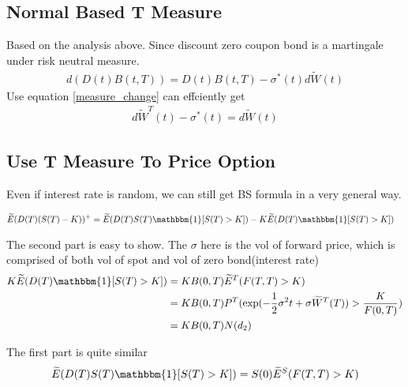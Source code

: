 \subsection{Normal Based T Measure}
Based on the analysis above. Since discount zero coupon bond is a martingale under risk neutral measure.
\begin{equation}
\begin{aligned}
d(D(t)B(t, T)) = D(t)B(t, T) - \sigma^\ast(t) d\widetilde{W}(t)
\end{aligned}
\end{equation}
Use equation \ref{measure_change} can effciently get
\begin{equation}
\begin{aligned}
d\widetilde{W}^T(t) - \sigma^\ast(t) = d\widetilde{W}(t)
\end{aligned}
\end{equation}

\subsection{Use T Measure To Price Option}
Even if interest rate is random, we can still get BS formula in a very general way.

\begin{equation}
\begin{aligned}
\widetilde{E}(D(T)(S(T) - K))^+ &= \widetilde{E}(D(T)S(T) \mathbbm{1} [ S(T) > K ]) - K\widetilde{E}(D(T)\mathbbm{1} [ S(T) > K ])
\end{aligned}
\end{equation}

The second part is easy to show. {\color{red} The $\sigma$ here is the vol of forward price, which is comprised of both vol of spot and vol of zero bond(interest rate)}
\begin{equation}
\begin{aligned}
 K\widetilde{E}(D(T)\mathbbm{1} [ S(T) > K ]) &= KB(0, T) \widetilde{E} ^ T (F(T, T) > K) \\
                                              &= KB(0, T) P^T(\exp(-\frac{1}{2}\sigma^2t + \sigma\widetilde{W}^T(T)) > \frac{K}{F(0, T)}) \\
                                              &= KB(0, T) N(d_2)
\end{aligned}
\end{equation}

The first part is quite similar
\begin{equation}
\begin{aligned}
\widetilde{E}(D(T)S(T) \mathbbm{1} [ S(T) > K ]) &= S(0) \widetilde{E} ^ S (F(T, T) > K) \\
\end{aligned}
\end{equation}

